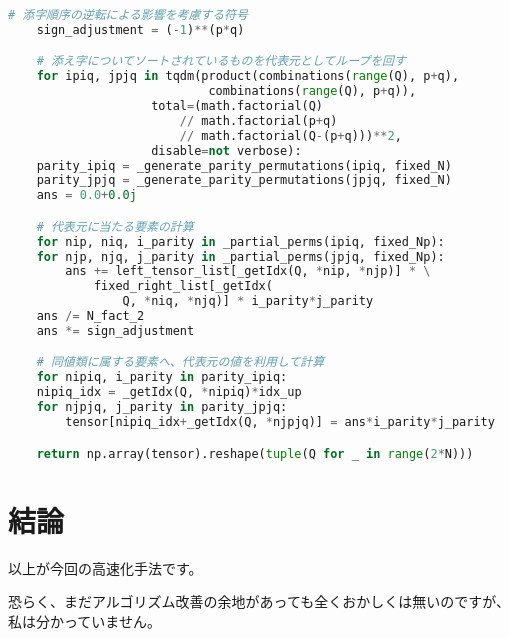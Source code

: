 \documentclass[a4paper, 10pt, dvipdfmx]{jlreq}
\begin{document}
\begin{lstlisting}[caption=code, label=code:code, language=Python]
    # 添字順序の逆転による影響を考慮する符号
    sign_adjustment = (-1)**(p*q)

    # 添え字についてソートされているものを代表元としてループを回す
    for ipiq, jpjq in tqdm(product(combinations(range(Q), p+q),
                            combinations(range(Q), p+q)),
                    total=(math.factorial(Q)
                        // math.factorial(p+q)
                        // math.factorial(Q-(p+q)))**2,
                    disable=not verbose):
    parity_ipiq = _generate_parity_permutations(ipiq, fixed_N)
    parity_jpjq = _generate_parity_permutations(jpjq, fixed_N)
    ans = 0.0+0.0j

    # 代表元に当たる要素の計算
    for nip, niq, i_parity in _partial_perms(ipiq, fixed_Np):
    for njp, njq, j_parity in _partial_perms(jpjq, fixed_Np):
        ans += left_tensor_list[_getIdx(Q, *nip, *njp)] * \
            fixed_right_list[_getIdx(
                Q, *niq, *njq)] * i_parity*j_parity
    ans /= N_fact_2
    ans *= sign_adjustment

    # 同値類に属する要素へ、代表元の値を利用して計算
    for nipiq, i_parity in parity_ipiq:
    nipiq_idx = _getIdx(Q, *nipiq)*idx_up
    for njpjq, j_parity in parity_jpjq:
        tensor[nipiq_idx+_getIdx(Q, *njpjq)] = ans*i_parity*j_parity

    return np.array(tensor).reshape(tuple(Q for _ in range(2*N)))
\end{lstlisting}

\section{結論}

以上が今回の高速化手法です。

恐らく、まだアルゴリズム改善の余地があっても全くおかしくは無いのですが、私は分かっていません。
\end{document}
